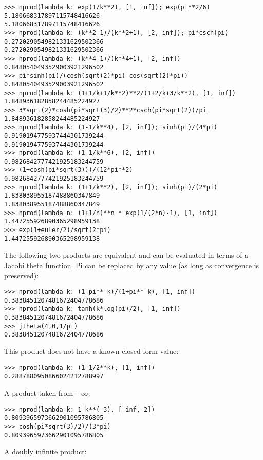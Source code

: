 \begin{lstlisting}
>>> nprod(lambda k: exp(1/k**2), [1, inf]); exp(pi**2/6)
5.180668317897115748416626
5.180668317897115748416626
>>> nprod(lambda k: (k**2-1)/(k**2+1), [2, inf]); pi*csch(pi)
0.2720290549821331629502366
0.2720290549821331629502366
>>> nprod(lambda k: (k**4-1)/(k**4+1), [2, inf])
0.8480540493529003921296502
>>> pi*sinh(pi)/(cosh(sqrt(2)*pi)-cos(sqrt(2)*pi))
0.8480540493529003921296502
>>> nprod(lambda k: (1+1/k+1/k**2)**2/(1+2/k+3/k**2), [1, inf])
1.848936182858244485224927
>>> 3*sqrt(2)*cosh(pi*sqrt(3)/2)**2*csch(pi*sqrt(2))/pi
1.848936182858244485224927
>>> nprod(lambda k: (1-1/k**4), [2, inf]); sinh(pi)/(4*pi)
0.9190194775937444301739244
0.9190194775937444301739244
>>> nprod(lambda k: (1-1/k**6), [2, inf])
0.9826842777421925183244759
>>> (1+cosh(pi*sqrt(3)))/(12*pi**2)
0.9826842777421925183244759
>>> nprod(lambda k: (1+1/k**2), [2, inf]); sinh(pi)/(2*pi)
1.838038955187488860347849
1.838038955187488860347849
>>> nprod(lambda n: (1+1/n)**n * exp(1/(2*n)-1), [1, inf])
1.447255926890365298959138
>>> exp(1+euler/2)/sqrt(2*pi)
1.447255926890365298959138
\end{lstlisting}

The following two products are equivalent and can be evaluated in terms of a Jacobi theta function. Pi can be replaced by any value (as long as convergence is preserved):

\begin{lstlisting}
>>> nprod(lambda k: (1-pi**-k)/(1+pi**-k), [1, inf])
0.3838451207481672404778686
>>> nprod(lambda k: tanh(k*log(pi)/2), [1, inf])
0.3838451207481672404778686
>>> jtheta(4,0,1/pi)
0.3838451207481672404778686
\end{lstlisting}

This product does not have a known closed form value:

\begin{lstlisting}
>>> nprod(lambda k: (1-1/2**k), [1, inf])
0.2887880950866024212788997
\end{lstlisting}

A product taken from $-\infty$:

\begin{lstlisting}
>>> nprod(lambda k: 1-k**(-3), [-inf,-2])
0.8093965973662901095786805
>>> cosh(pi*sqrt(3)/2)/(3*pi)
0.8093965973662901095786805
\end{lstlisting}

A doubly infinite product:

